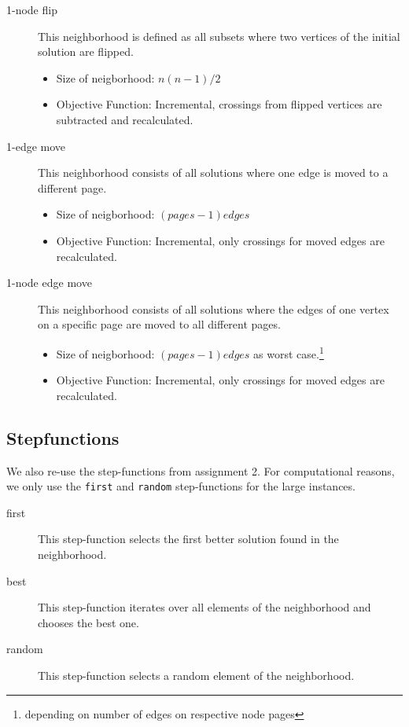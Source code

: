 \documentclass{scrartcl}
\begin{document}
\begin{description}
\item[1-node flip] 
    
    This neighborhood is defined as all subsets where two vertices of the initial solution are flipped. 
    \begin{itemize}
        \item Size of neigborhood: $n(n-1)/2$
        \item Objective Function: Incremental, crossings from flipped vertices are subtracted and recalculated.

    \end{itemize}

	
\item[1-edge move] This neighborhood consists of all solutions where one edge is moved to a different page. 
     \begin{itemize}
        \item Size of neigborhood: $(pages-1) edges$ 
        \item Objective Function: Incremental, only crossings for moved edges are recalculated.
    \end{itemize}
   
	
\item[1-node edge move] This neighborhood consists of all solutions where the edges of
	one vertex on a specific page are moved to all different pages. 

    \begin{itemize}
        \item Size of neigborhood: $(pages-1) edges$ as worst case.\footnote{depending on number of edges on respective node pages}
        \item Objective Function: Incremental, only crossings for moved edges are recalculated.
    \end{itemize}
    

\end{description}

\subsection{Stepfunctions}

We also re-use the step-functions from assignment 2. For computational
reasons, we only use the \texttt{first} and \texttt{random}
step-functions for the large instances.

\begin{description}
\item[first] This step-function selects the first better solution found in the neighborhood.
\item[best] This step-function iterates over all elements of the neighborhood and chooses the best one.
\item[random] This step-function selects a random element of the neighborhood. 
\end{description}
\end{document}
